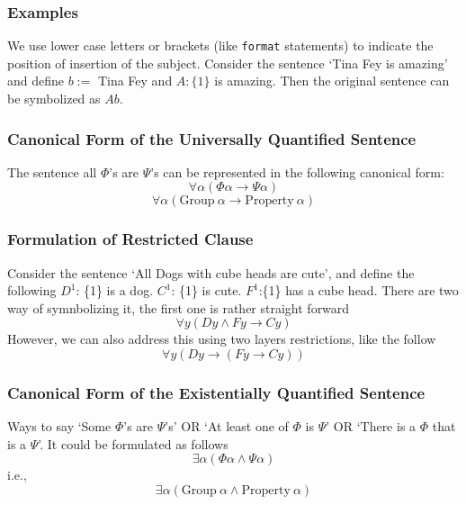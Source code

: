\documentclass[10pt]{article}
\renewcommand{\implies}{\rightarrow}
\begin{document}
\subsubsection{Examples} We use lower case letters or brackets (like \texttt{format} statements) to indicate the position of insertion of the subject. Consider the sentence `Tina Fey is amazing' and define $b:=$ Tina Fey and $A:\{1\}$ is amazing. Then the original sentence can be symbolized as $Ab$.

\subsubsection{Canonical Form of the Universally Quantified Sentence} 
The sentence all $\Phi$'s are $\Psi$'s can be represented in the following canonical form:
\begin{equation*}
    \forall \alpha (\Phi \alpha \implies \Psi \alpha)
\end{equation*}
\begin{equation*}
    \forall \alpha (\text{Group}~\alpha \implies \text{Property}~\alpha)
\end{equation*}

\subsubsection{Formulation of Restricted Clause}
Consider the sentence `All Dogs with cube heads are cute', and define the following $D^1$: \{1\} is a dog. $C^1$: \{1\} is cute. $F^1$:\{1\} has a cube head. There are two way of symnbolizing it, the first one is rather straight forward
\begin{equation*}
    \forall y(Dy \wedge Fy \implies Cy)
\end{equation*}
However, we can also address this using two layers restrictions, like the follow
\begin{equation*}
    \forall y(Dy \implies (Fy \implies Cy))
\end{equation*}

\subsubsection{Canonical Form of the Existentially Quantified Sentence} 
Ways to say `Some $\Phi$'s are $\Psi$'s' OR `At least one of $\Phi$ is $\Psi$' OR `There is a $\Phi$ that is a $\Psi$'. It could be formulated as follows
\begin{equation*}
    \exists \alpha (\Phi \alpha \wedge \Psi \alpha)
\end{equation*}
i.e., 
\begin{equation*}
    \exists \alpha (\text{Group}~ \alpha \wedge \text{Property}~\alpha)
\end{equation*}
\end{document}
